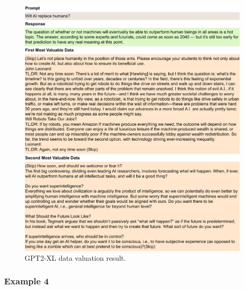 \begin{figure}[htbp]
    \centering
    \includegraphics[width=0.99\textwidth]{figures/gpt2_appendix3.pdf}
    \caption{GPT2-XL data valuation result.}
\end{figure}

\clearpage
\subsubsection{Example 4}

